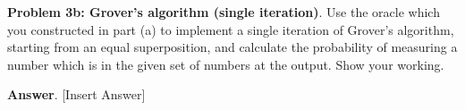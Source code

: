 \textbf{Problem 3b: Grover's algorithm (single iteration)}. Use the oracle which you constructed in part (a) to implement a single iteration of Grover's algorithm, starting from an equal superposition, and calculate the probability of measuring a number which is in the given set of numbers at the output. 
Show your working.


\textbf{Answer}. [Insert Answer]


